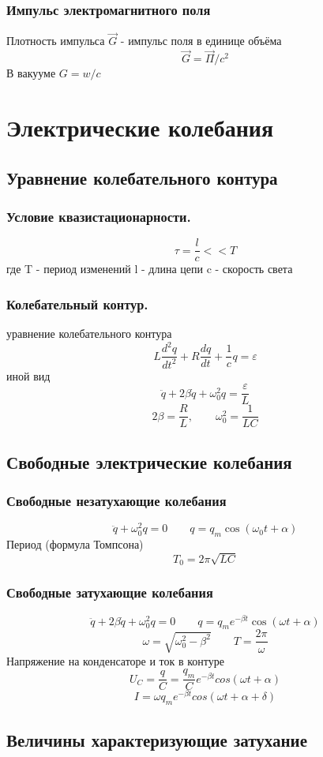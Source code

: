 \documentclass{article}
\begin{document}
\subsubsection{Импульс электромагнитного поля}
Плотность импульса $\vec{G}$ - импульс поля в единице объёма
\[\vec{G}=\vec{\Pi}/c^2\]
В вакууме $G=w/c$
\section{Электрические колебания}
\subsection{Уравнение колебательного контура}
\subsubsection{
    Условие квазистационарности.
}
\[ \tau=\frac{l}{c} << T\]
где T - период изменений 
l - длина цепи 
c - скорость света
\subsubsection{
    Колебательный контур.
}
уравнение колебательного контура
\[L\frac{d^2q}{dt^2}+R\frac{dq}{dt} + \frac{1}{c}q = \varepsilon\] 
иной вид
\[\ddot{q} + 2\beta\dot{q} + \omega_0^2q = \frac{\varepsilon}{L}\]
\[2\beta = \frac{R}{L}, \qquad \omega_0^2 = \frac{1}{LC} \]
\subsection{
    Свободные электрические колебания
}
\subsubsection{
    Свободные незатухающие колебания
}
\[\ddot{q} + \omega_0^2q = 0 \qquad q= q_m\cos(\omega_0t + \alpha)\]
Период (формула Томпсона)
\[T_0 = 2\pi\sqrt{LC}\]
\subsubsection{
    Свободные затухающие колебания
}
\[\ddot{q} + 2\beta\dot{q} + \omega_0^2q = 0 \qquad q= q_m e^{-\beta t} \cos(\omega t + \alpha)\]
\[\omega = \sqrt{\omega_0^2 - \beta^2} \qquad T = \frac{2\pi}{\omega}\]
Напряжение на конденсаторе и ток в контуре
\[U_C = \frac{q}{C} = \frac{q_m}{C}e^{-\beta t}cos(\omega t + \alpha)\]
\[I = \omega q_m e ^ {-\beta t} cos(\omega t + \alpha + \delta)\]
\subsection{
    Величины характеризующие затухание
}
\end{document}
